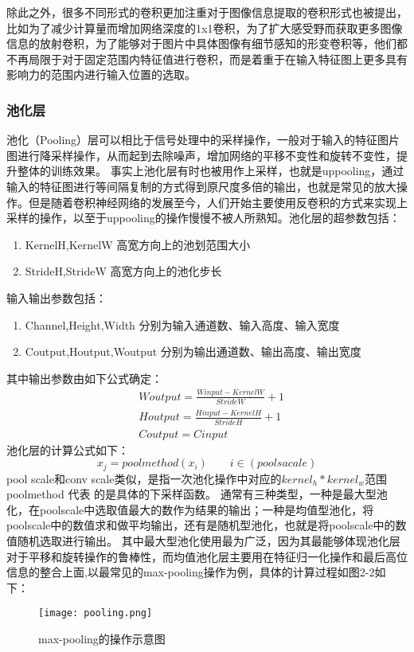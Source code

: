 除此之外，很多不同形式的卷积更加注重对于图像信息提取的卷积形式也被提出，比如为了减少计算量而增加网络深度的1x1卷积\cite{1x1CONV}，为了扩大感受野而获取更多图像信息的放射卷积\cite{DILUTECONV}，为了能够对于图片中具体图像有细节感知的形变卷积\cite{DEFORMCONV}等，他们都不再局限于对于固定范围内特征值进行卷积，而是着重于在输入特征图上更多具有影响力的范围内进行输入位置的选取。

\subsubsection{池化层}
池化（Pooling）层可以相比于信号处理中的采样操作，一般对于输入的特征图片图进行降采样操作，从而起到去除噪声，增加网络的平移不变性和旋转不变性，提升整体的训练效果。
事实上池化层有时也被用作上采样，也就是uppooling，通过输入的特征图进行等间隔复制的方式得到原尺度多倍的输出，也就是常见的放大操作。但是随着卷积神经网络的发展至今，人们开始主要使用反卷积的方式来实现上采样的操作，以至于uppooling的操作慢慢不被人所熟知。池化层的超参数包括：
\begin{enumerate}
\item KernelH,KernelW 高宽方向上的池划范围大小 
\item StrideH,StrideW 高宽方向上的池化步长
\end{enumerate}
输入输出参数包括：
\begin{enumerate}
\item Channel,Height,Width 分别为输入通道数、输入高度、输入宽度
\item  Coutput,Houtput,Woutput 分别为输出通道数、输出高度、输出宽度
\end{enumerate}
其中输出参数由如下公式确定：
\begin{equation}[h]
{
\begin{split}
 & Woutput= \frac{Winput-KernelW}{StrideW} +1 \\
 & Houtput= \frac{Hinput-KernelH}{StrideH} +1 \\
 & Coutput= Cinput
\end{split}
}\end{equation}
池化层的计算公式如下：
\begin{equation}[h]
{
x_j=poolmethod(x_i) \qquad  i\in (poolsacale)
}
\end{equation}
pool scale和conv scale类似，是指一次池化操作中对应的$kernel_h*kernel_w$范围
poolmethod 代表 的是具体的下采样函数。
通常有三种类型，一种是最大型池化，在poolscale中选取值最大的数作为结果的输出；一种是均值型池化，将poolscale中的数值求和做平均输出，还有是随机型池化，也就是将poolscale中的数值随机选取进行输出。
其中最大型池化使用最为广泛，因为其最能够体现池化层对于平移和旋转操作的鲁棒性，而均值池化层主要用在特征归一化操作和最后高位信息的整合上面,以最常见的max-pooling操作为例，具体的计算过程如图2-2如下：
\begin{figure}[!ht]
 \centering
	\texttt{[image: pooling.png]}
	\caption{max-pooling的操作示意图}
\end{figure}


